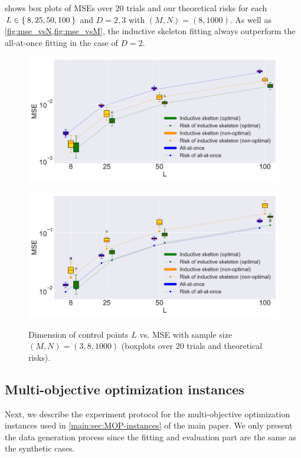 \documentclass{article}
\begin{document}
 shows box plots of MSEs over 20 trials and our theoretical risks for each $L\in \Set{8, 25, 50, 100}$ and $D = 2, 3$ with $(M, N)=(8, 1000)$.
As well as \cref{fig:mse_vsN,fig:mse_vsM}, the inductive skeleton fitting always outperform the all-at-once fitting in the case of $D = 2$.


\begin{figure}[ht]
 \begin{minipage}{0.49\hsize}
        \centering
    \includegraphics[width=1\textwidth]{neurips2019/fig/D=2_M=8_N=1000.pdf}
    \label{fig:mse_vsL_d2}
 \end{minipage}
 \begin{minipage}{0.49\hsize}
        \centering
    \includegraphics[width=1\textwidth]{neurips2019/fig/D=3_M=8_N=1000.pdf}
    \label{fig:mse_vsL_d3}
 \end{minipage}
 \caption{Dimension of control points $L$ vs. MSE with sample size $(M, N) = (3, 8, 1000)$ (boxplots over 20 trials and theoretical risks).}
\label{fig:mse_vsL}
\end{figure}

\subsection{Multi-objective optimization instances}\label{sec:MOP-instances}
Next, we describe the experiment protocol for the multi-objective optimization instances used in \cref{main:sec:MOP-instances} of the main paper.
We only present the data generation process since the fitting and evaluation part are the same as the synthetic cases.
\end{document}
